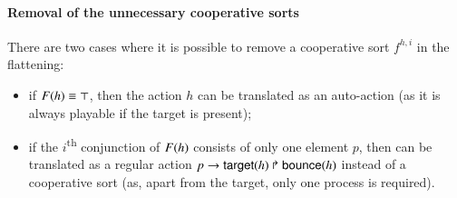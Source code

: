 \paragraph{Removal of the unnecessary cooperative sorts}
There are two cases where it is possible to remove a cooperative sort $f^{h,i}$ in the flattening:
\begin{itemize}
  \item if $F(h) \equiv \top$, then the action $h$ can be translated as an auto-action
    (as it is always playable if the target is present);
  \item if the $i$\textsuperscript{th} conjunction of $F(h)$ consists of only one element $p$,
    then  can be translated as a regular action $p\rightarrow\mathsf{target}(h)\Rsh\mathsf{bounce}(h)$ instead of a cooperative sort
    (as, apart from the target, only one process is required).
\end{itemize}
